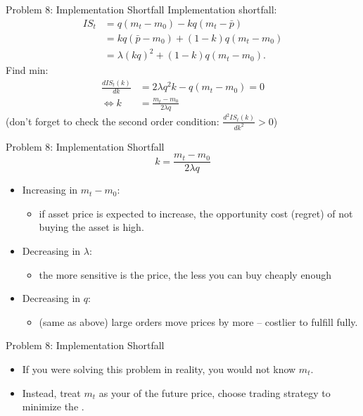 \documentclass[english,10pt
,aspectratio=169
]{beamer}
\begin{document}
\begin{frame}{Problem 8: Implementation Shortfall}
	Implementation shortfall:
	\begin{align*}
		IS_t 
		& = q(m_t-m_0) - k q (m_t - \bar{p}) 
		\\
		& = k q(\bar{p} - m_0) + (1-k) q (m_t - m_0)
		\\
		& = \lambda (k q)^2 + (1-k) q (m_t - m_0).
	\end{align*}
	\pause
	Find min:
	\begin{align*}
		\frac{d IS_t(k)}{dk} &= 2 \lambda q^2 k - q (m_t - m_0) = 0
		\\
		\Leftrightarrow k &= \frac{m_t - m_0}{2\lambda q}
	\end{align*}
	(don't forget to check the second order condition: $\frac{d^2 IS_t(k)}{dk^2} > 0$)
\end{frame}


\begin{frame}{Problem 8: Implementation Shortfall}
	$$ k = \frac{m_t - m_0}{2\lambda q} $$
	\begin{itemize}
		\item Increasing in $m_t - m_0$:
		\begin{itemize}
			\item if asset price is expected to increase, the opportunity cost (regret) of not buying the asset is high.
		\end{itemize}
		\item Decreasing in $\lambda$:
		\begin{itemize}
			\item the more sensitive is the price, the less you can buy cheaply enough
		\end{itemize}
		\item Decreasing in $q$:
		\begin{itemize}
			\item (same as above) large orders move prices by more -- costlier to fulfill fully.
		\end{itemize}
	\end{itemize}
\end{frame}


\begin{frame}{Problem 8: Implementation Shortfall}
	\begin{itemize}
		\item If you were solving this problem in reality, you would not know $m_t$.
		\item Instead, treat $m_t$ as your  of the future price, choose trading strategy to minimize the .
	\end{itemize}
\end{frame}
\end{document}
